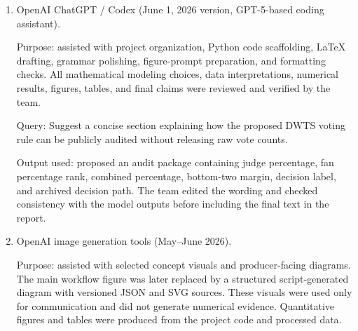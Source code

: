 \documentclass[12pt]{article}
\begin{document}
\begin{enumerate}
  \item OpenAI ChatGPT / Codex (June 1, 2026 version, GPT-5-based coding
  assistant).

  Purpose: assisted with project organization, Python code scaffolding, LaTeX
  drafting, grammar polishing, figure-prompt preparation, and formatting
  checks. All mathematical modeling choices, data interpretations, numerical
  results, figures, tables, and final claims were reviewed and verified by the
  team.

  Query: Suggest a concise section explaining how the proposed DWTS voting rule
  can be publicly audited without releasing raw vote counts.

  Output used: proposed an audit package containing judge percentage, fan
  percentage rank, combined percentage, bottom-two margin, decision label, and
  archived decision path. The team edited the wording and checked consistency
  with the model outputs before including the final text in the report.

  \item OpenAI image generation tools (May--June 2026).

  Purpose: assisted with selected concept visuals and producer-facing diagrams.
  The main workflow figure was later replaced by a structured script-generated
  diagram with versioned JSON and SVG sources. These visuals were used only for
  communication and did not generate numerical evidence. Quantitative figures
  and tables were produced from the project code and processed data.
\end{enumerate}
\end{document}
